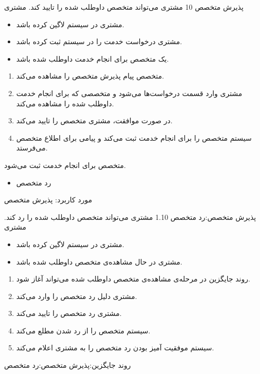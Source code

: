 {
\usecase
{پذیرش متخصص}
{10}
{مشتری می‌تواند متخصص داوطلب شده را تایید کند.}
{مشتری}
{}
{	
	\begin{itemize}
		\vspace*{-0.6cm}
		\item 
		مشتری در سیستم لاگین کرده باشد.
		\item
		مشتری درخواست خدمت را در سیستم ثبت کرده باشد.
		\item
		یک متخصص برای انجام خدمت داوطلب شده باشد.
	\end{itemize}
}
{
	\vspace*{-0.6cm}
	\begin{enumerate}
		\item
					متخصص پیام پذیرش متخصص  را مشاهده می‌کند.
		\item 
		مشتری وارد قسمت درخواست‌ها می‌شود و متخصصی که برای انجام خدمت داوطلب شده را مشاهده می‌کند.
		\item 
		در صورت موافقت، مشتری متخصص را تایید می‌کند.
		\item 
		سیستم متخصص را برای انجام خدمت ثبت می‌کند و پیامی برای اطلاع متخصص می‌فرستد.
	\end{enumerate}
}
{متخصص برای انجام خدمت ثبت می‌شود.}
{
	\begin{itemize}
		\vspace*{-0.6cm}
		\item
		رد متخصص
	\end{itemize}
}
{
	مورد کاربرد: پذیرش متخصص
}

\alternativeflow
{
	 پذیرش متخصص:رد متخصص
}
{1.10}
{
	مشتری می‌تواند متخصص داوطلب شده را رد کند.
}
{
	مشتری
}
{}
{
	\begin{itemize}
		\vspace*{-0.6cm}
		\item 
		مشتری در سیستم لاگین کرده باشد.
		\item
		مشتری در حال مشاهده‌ی متخصص داوطلب شده باشد.
	\end{itemize}
}
{
	\vspace*{-0.6cm}
	\begin{enumerate}
		\item 
		روند جایگزین در مرحله‌ی مشاهده‌ی متخصص داوطلب شده می‌تواند آغاز شود.
		\item
		مشتری دلیل رد متخصص را وارد می‌کند.
		\item
		مشتری رد متخصص را تایید می‌کند.
		\item
		سیستم متخصص را از رد شدن مطلع می‌کند.
		\item
		سیستم موفقیت آمیز بودن رد متخصص را به مشتری اعلام می‌کند.
	\end{enumerate}
}
{
}
{
روند جایگزین:پذیرش متخصص:رد متخصص
}
}


